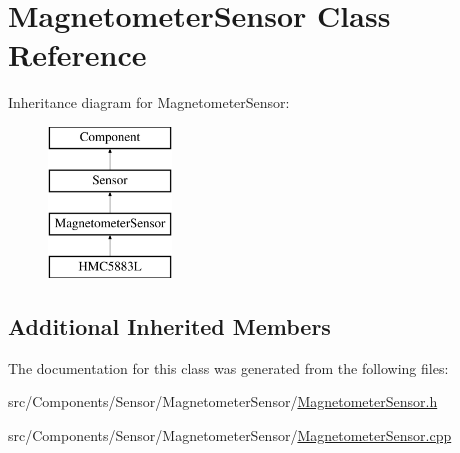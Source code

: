 \hypertarget{classMagnetometerSensor}{}\section{Magnetometer\+Sensor Class Reference}
\label{classMagnetometerSensor}
Inheritance diagram for Magnetometer\+Sensor\+:\begin{figure}[H]
\begin{center}
\leavevmode
\includegraphics[height=4.000000cm]{classMagnetometerSensor}
\end{center}
\end{figure}
\subsection*{Additional Inherited Members}


The documentation for this class was generated from the following files\+:\begin{DoxyCompactItemize}
\item 
src/\+Components/\+Sensor/\+Magnetometer\+Sensor/\hyperlink{MagnetometerSensor_8h}{Magnetometer\+Sensor.\+h}\item 
src/\+Components/\+Sensor/\+Magnetometer\+Sensor/\hyperlink{MagnetometerSensor_8cpp}{Magnetometer\+Sensor.\+cpp}\end{DoxyCompactItemize}
